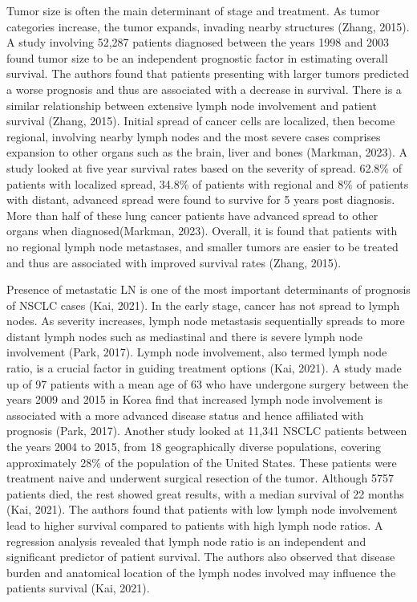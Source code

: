 \documentclass[
  letterpaper,
  DIV=11,
  numbers=noendperiod]{scrartcl}
\begin{document}
Tumor size is often the main determinant of stage and treatment. As
tumor categories increase, the tumor expands, invading nearby structures
(Zhang, 2015). A study involving 52,287 patients diagnosed between the
years 1998 and 2003 found tumor size to be an independent prognostic
factor in estimating overall survival. The authors found that patients
presenting with larger tumors predicted a worse prognosis and thus are
associated with a decrease in survival. There is a similar relationship
between extensive lymph node involvement and patient survival (Zhang,
2015). Initial spread of cancer cells are localized, then become
regional, involving nearby lymph nodes and the most severe cases
comprises expansion to other organs such as the brain, liver and bones
(Markman, 2023). A study looked at five year survival rates based on the
severity of spread. 62.8\% of patients with localized spread, 34.8\% of
patients with regional and 8\% of patients with distant, advanced spread
were found to survive for 5 years post diagnosis. More than half of
these lung cancer patients have advanced spread to other organs when
diagnosed(Markman, 2023). Overall, it is found that patients with no
regional lymph node metastases, and smaller tumors are easier to be
treated and thus are associated with improved survival rates (Zhang,
2015).

Presence of metastatic LN is one of the most important determinants of
prognosis of NSCLC cases (Kai, 2021). In the early stage, cancer has not
spread to lymph nodes. As severity increases, lymph node metastasis
sequentially spreads to more distant lymph nodes such as mediastinal and
there is severe lymph node involvement (Park, 2017). Lymph node
involvement, also termed lymph node ratio, is a crucial factor in
guiding treatment options (Kai, 2021). A study made up of 97 patients
with a mean age of 63 who have undergone surgery between the years 2009
and 2015 in Korea find that increased lymph node involvement is
associated with a more advanced disease status and hence affiliated with
prognosis (Park, 2017). Another study looked at 11,341 NSCLC patients
between the years 2004 to 2015, from 18 geographically diverse
populations, covering approximately 28\% of the population of the United
States. These patients were treatment naive and underwent surgical
resection of the tumor. Although 5757 patients died, the rest showed
great results, with a median survival of 22 months (Kai, 2021). The
authors found that patients with low lymph node involvement lead to
higher survival compared to patients with high lymph node ratios. A
regression analysis revealed that lymph node ratio is an independent and
significant predictor of patient survival. The authors also observed
that disease burden and anatomical location of the lymph nodes involved
may influence the patients survival (Kai, 2021).
\end{document}
